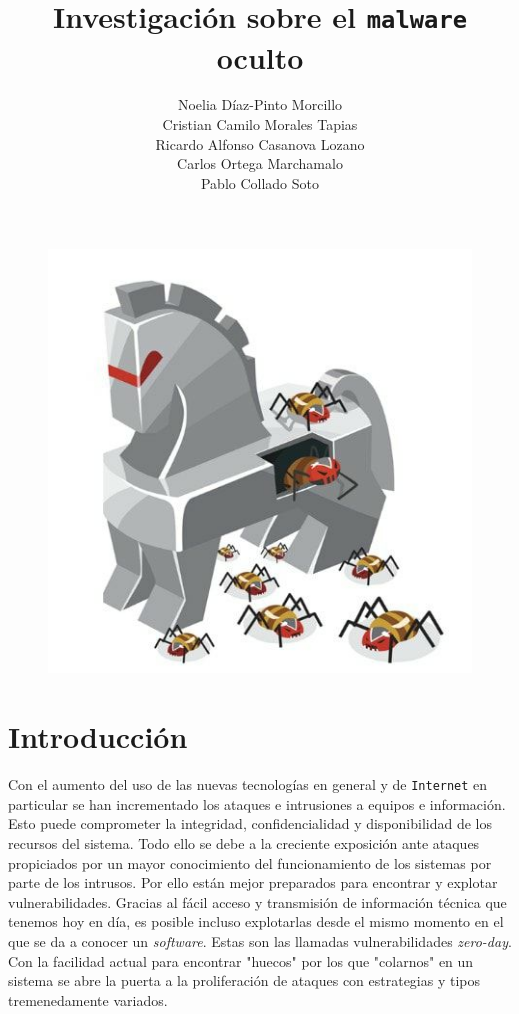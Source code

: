 \documentclass[12pt]{article}
\title{Investigación sobre el \texttt{malware} oculto}
\author{Noelia Díaz-Pinto Morcillo \\ Cristian Camilo Morales Tapias \\ Ricardo Alfonso Casanova Lozano \\ Carlos Ortega Marchamalo \\ Pablo Collado Soto}
\date{}
\newcommand{\newpar} {
    \vskip 0.5cm
}
\begin{document}
    \begin{titlingpage}
        \maketitle
        \newpar
        \newpar
        \begin{figure}[!htb]
            \centering
            \includegraphics[width=0.75\linewidth]{cover_pic.jpg}
        \end{figure}
    \end{titlingpage}

    \newpage
    \tableofcontents
    \newpage

    \section{Introducción}
        Con el aumento del uso de las nuevas tecnologías en general y de \texttt{Internet} en particular se han incrementado los ataques e intrusiones a equipos e información. Esto puede comprometer la integridad, confidencialidad y disponibilidad de los recursos del sistema. Todo ello se debe a la creciente exposición ante ataques propiciados por un mayor conocimiento del funcionamiento de los sistemas por parte de los intrusos. Por ello están mejor preparados para encontrar y explotar vulnerabilidades. Gracias al fácil acceso y transmisión de información técnica que tenemos hoy en día, es posible incluso explotarlas desde el mismo momento en el que se da a conocer un \textit{software}. Estas son las llamadas vulnerabilidades \textit{zero-day}. Con la facilidad actual para encontrar "huecos" por los que "colarnos" en un sistema se abre la puerta a la proliferación de ataques con estrategias y tipos tremenedamente variados.
\end{document}
